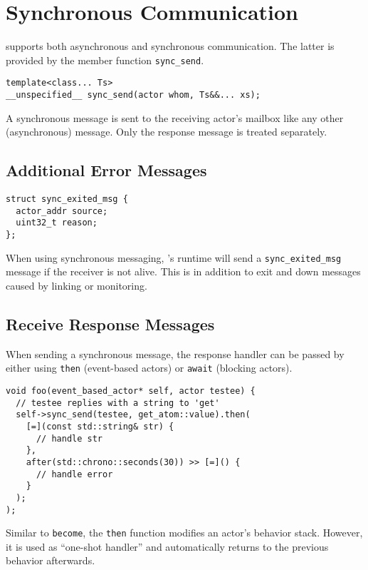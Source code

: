 \section{Synchronous Communication}

\lib supports both asynchronous and synchronous communication. The latter is provided by the member function \lstinline^sync_send^.

\begin{lstlisting}
template<class... Ts>
__unspecified__ sync_send(actor whom, Ts&&... xs);
\end{lstlisting}

A synchronous message is sent to the receiving actor's mailbox like any other (asynchronous) message. Only the response message is treated separately.

\subsection{Additional Error Messages}

\begin{lstlisting}
struct sync_exited_msg {
  actor_addr source;
  uint32_t reason;
};
\end{lstlisting}

When using synchronous messaging, \lib's runtime will send a \lstinline^sync_exited_msg^ message if the receiver is not alive. This is in addition to exit and down messages caused by linking or monitoring.

\subsection{Receive Response Messages}

When sending a synchronous message, the response handler can be passed by either using \lstinline^then^ (event-based actors) or \lstinline^await^ (blocking actors).

\begin{lstlisting}
void foo(event_based_actor* self, actor testee) {
  // testee replies with a string to 'get'
  self->sync_send(testee, get_atom::value).then(
    [=](const std::string& str) {
      // handle str
    },
    after(std::chrono::seconds(30)) >> [=]() {
      // handle error
    }
  );
);
\end{lstlisting}

Similar to \lstinline^become^, the \lstinline^then^ function modifies an actor's behavior stack.
However, it is used as ``one-shot handler'' and automatically returns to the previous behavior afterwards.

